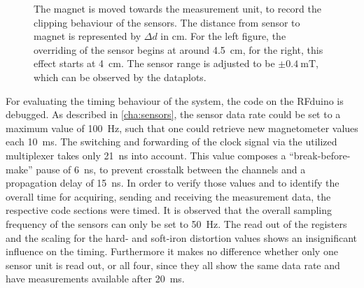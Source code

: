 \begin{figure}[!htb]
\hfill
{}
\caption[Clipping behaviour of sensor]
{The magnet is moved towards the measurement unit, to record the clipping behaviour of the sensors. The distance from sensor to magnet is represented by $ \Delta d $ in \si{\cm}. For the left figure, the overriding of the sensor begins at around \SI{4.5}{\cm}, for the right, this effect starts at \SI{4}{\cm}. The sensor range is adjusted to be $ \pm \SI{0.4}{\milli \tesla} $, which can be observed by the dataplots.}
\label{fig:clipping}
\end{figure}
For evaluating the timing behaviour of the system, the code on the RFduino is debugged. As described in \ref{cha:sensors}, the sensor data rate could be set to a maximum value of \SI{100}{\Hz}, such that one could retrieve new magnetometer values each \SI{10}{\milli \second}. The switching and forwarding of the clock signal via the utilized multiplexer takes only \SI{21}{\nano\second} into account. This value composes a ``break-before-make'' pause of \SI{6}{\nano \second}, to prevent crosstalk between the channels and a propagation delay of \SI{15}{\nano \second}. In order to verify those values and to identify the overall time for acquiring, sending and receiving the measurement data, the respective code sections were timed. It is observed that the overall sampling frequency of the sensors can only be set to \SI{50}{\Hz}. The read out of the registers and the scaling for the hard- and soft-iron distortion values shows an insignificant influence on the timing. Furthermore it makes no difference whether only one sensor unit is read out, or all four, since they all show the same data rate and have measurements available after \SI{20}{\milli \second}.\\
